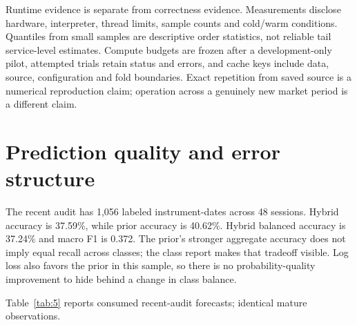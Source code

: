 \documentclass[11pt,a4paper]{article}
\begin{document}
Runtime evidence is separate from correctness evidence. Measurements disclose hardware, interpreter, thread limits, sample counts and cold/warm conditions. Quantiles from small samples are descriptive order statistics, not reliable tail service-level estimates. Compute budgets are frozen after a development-only pilot, attempted trials retain status and errors, and cache keys include data, source, configuration and fold boundaries. Exact repetition from saved source is a numerical reproduction claim; operation across a genuinely new market period is a different claim.


\section{Prediction quality and error structure}\label{sec:section-06}

The recent audit has 1,056 labeled instrument-dates across 48 sessions. Hybrid accuracy is 37.59\%, while prior accuracy is 40.62\%. Hybrid balanced accuracy is 37.24\% and macro F1 is 0.372. The prior's stronger aggregate accuracy does not imply equal recall across classes; the class report makes that tradeoff visible. Log loss also favors the prior in this sample, so there is no probability-quality improvement to hide behind a change in class balance.

\noindent Table~\ref{tab:5} reports consumed recent-audit forecasts; identical mature observations.
\end{document}
